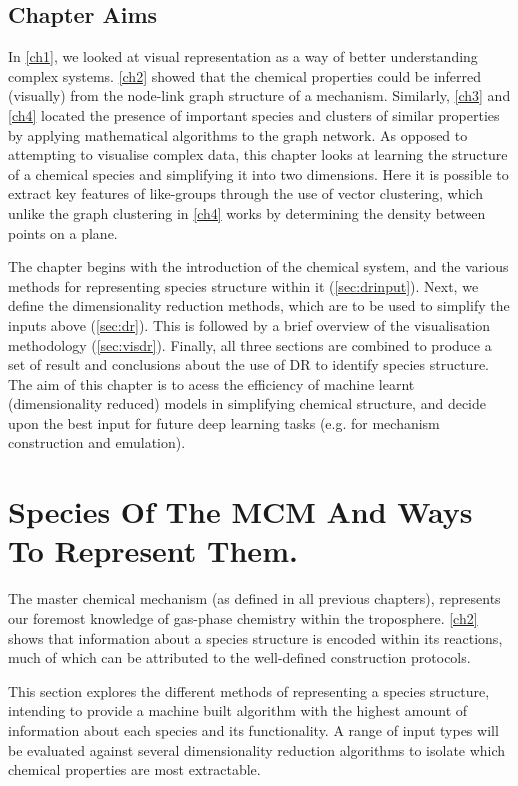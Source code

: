 \subsection{Chapter Aims}
In \autoref{ch1}, we looked at visual representation as a way of better understanding complex systems. \autoref{ch2} showed that the chemical properties could be inferred (visually) from the node-link graph structure of a mechanism. Similarly, \autoref{ch3} and \autoref{ch4} located the presence of important species and clusters of similar properties by applying mathematical algorithms to the graph network. As opposed to attempting to visualise complex data, this chapter looks at learning the structure of a chemical species and simplifying it into two dimensions. Here it is possible to extract key features of like-groups through the use of vector clustering, which unlike the graph clustering in \autoref{ch4} works by determining the density between points on a plane.

The chapter begins with the introduction of the chemical system, and the various methods for representing species structure within it (\autoref{sec:drinput}). Next, we define the dimensionality reduction methods, which are to be used to simplify the inputs above (\autoref{sec:dr}). This is followed by a brief overview of the visualisation methodology (\autoref{sec:visdr}). Finally, all three sections are combined to produce a set of result and conclusions about the use of DR to identify species structure. The aim of this chapter is to acess the efficiency of machine learnt (dimensionality reduced) models in simplifying chemical structure, and decide upon the best input for future deep learning tasks (e.g. for mechanism construction and emulation).



\section{Species Of The MCM And Ways To Represent Them.}\label{sec:drinput}
The master chemical mechanism (as defined in all previous chapters), represents our foremost knowledge of gas-phase chemistry within the troposphere.  \autoref{ch2} shows that information about a species structure is encoded within its reactions, much of which can be attributed to the well-defined construction protocols.

This section explores the different methods of representing a species structure, intending to provide a machine built algorithm with the highest amount of information about each species and its functionality. A range of input types will be evaluated against several dimensionality reduction algorithms to isolate which chemical properties are most extractable.


